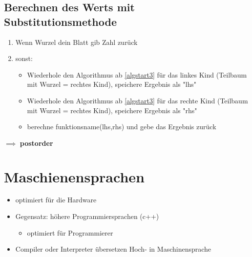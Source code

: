 \documentclass[a4paper]{scrartcl}
\theoremstyle{definition}
\theoremstyle{plain}
\theoremstyle{remark}
\theoremstyle{remark}
\begin{document}
\subsection{Berechnen des Werts mit Substitutionsmethode}
\label{sec-4-6}
\begin{enumerate}
\item \label{algstart3} Wenn Wurzel dein Blatt gib Zahl zurück
\item sonst:
\begin{itemize}
\item Wiederhole den Algorithmus ab \ref{algstart3} für das linkes Kind (Teilbaum mit Wurzel = rechtes Kind), speichere Ergebnis als "lhs"
\item Wiederhole den Algorithmus ab \ref{algstart3} für das rechte Kind (Teilbaum mit Wurzel = rechtes Kind), speichere Ergebnis als "rhs"
\item berechne funktionsname(lhs,rhs) und gebe das Ergebnis zurück
\end{itemize}
\end{enumerate}
$\implies$ \textbf{postorder}
\section{Maschienensprachen}
\label{sec-5}
\begin{itemize}
\item optimiert für die Hardware
\item Gegensatz: höhere Programmiersprachen (c++)
\begin{itemize}
\item optimiert für Programmierer
\end{itemize}
\item Compiler oder Interpreter übersetzen Hoch- in Maschinensprache
\end{itemize}
\end{document}
